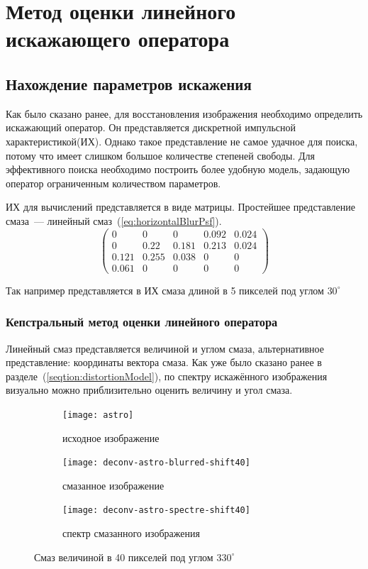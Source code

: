 \chapter{Метод оценки линейного искажающего оператора}
\section{Нахождение параметров искажения}
Как было сказано ранее, для восстановления изображения необходимо определить искажающий оператор. Он представляется дискретной импульсной характеристикой(ИХ). Однако такое представление не самое удачное для поиска, потому что имеет слишком большое количестве степеней свободы. Для эффективного поиска необходимо построить более удобную модель, задающую оператор ограниченным количеством параметров.

ИХ для вычислений представляется в виде матрицы. Простейшее представление смаза~--- линейный смаз~(\ref{eq:horizontalBlurPsf}).
\begin{equation}\label{eq:linearBlurArray}
\begin{pmatrix}
0 & 0 & 0 & 0.092 & 0.024\\
0 & 0.22 & 0.181 & 0.213 & 0.024\\
0.121 & 0.255 & 0.038 & 0 & 0\\
0.061 & 0 & 0 & 0 & 0
\end{pmatrix}
\end{equation}

Так например представляется в ИХ смаза длиной в 5 пикселей под углом $30^\circ$
\subsection{Кепстральный метод оценки линейного оператора}
Линейный смаз представляется величиной и углом смаза, альтернативное представление: координаты вектора смаза. Как уже было сказано ранее в разделе~(\ref{seqtion:distortionModel}), по спектру искажённого изображения визуально можно приблизительно оценить величину и угол смаза.
\begin{figure}[h!]
	\centering
	\begin{subfigure}[t]{0.3\textwidth}
		\texttt{[image: astro]}
		\caption{исходное изображение}
	\end{subfigure}
	\hfill
	\begin{subfigure}[t]{0.3\textwidth}
		\texttt{[image: deconv-astro-blurred-shift40]}
		\caption{смазанное изображение}
		\label{fig:astroShift40}
	\end{subfigure}%
	\hfill
	\begin{subfigure}[t]{0.3\textwidth}
		\texttt{[image: deconv-astro-spectre-shift40]}
		\caption{спектр смазанного изображения}
		\label{fig:astroShift40Spectre}
	\end{subfigure}
	\caption{Смаз величиной в 40 пикселей под углом $330^{\circ}$}
	\label{fig:spectre}
\end{figure}

